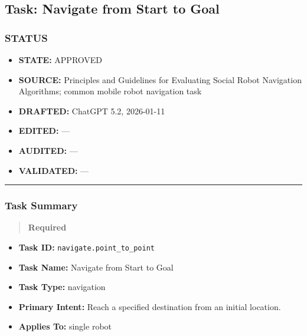 \documentclass[utf8]{frontiers_suppmat} %
\providecommand{\tightlist}{%
  \setlength{\itemsep}{0pt}\setlength{\parskip}{0pt}}
\begin{document}
\subsection{Task: Navigate from Start to
Goal}\label{task-navigate-from-start-to-goal}

\subsubsection{STATUS}\label{status}

\begin{itemize}
\tightlist
\item
  \textbf{STATE:} APPROVED\\
\item
  \textbf{SOURCE:} Principles and Guidelines for Evaluating Social Robot
  Navigation Algorithms; common mobile robot navigation task\\
\item
  \textbf{DRAFTED:} ChatGPT 5.2, 2026-01-11\\
\item
  \textbf{EDITED:} ---\\
\item
  \textbf{AUDITED:} ---\\
\item
  \textbf{VALIDATED:} ---
\end{itemize}

\begin{center}\rule{0.5\linewidth}{0.5pt}\end{center}

\subsubsection{Task Summary}\label{task-summary}

\begin{quote}
\textbf{Required}
\end{quote}

\begin{itemize}
\tightlist
\item
  \textbf{Task ID:} \texttt{navigate.point\_to\_point}\\
\item
  \textbf{Task Name:} Navigate from Start to Goal\\
\item
  \textbf{Task Type:} navigation\\
\item
  \textbf{Primary Intent:} Reach a specified destination from an initial
  location.\\
\item
  \textbf{Applies To:} single robot
\end{itemize}
\end{document}
